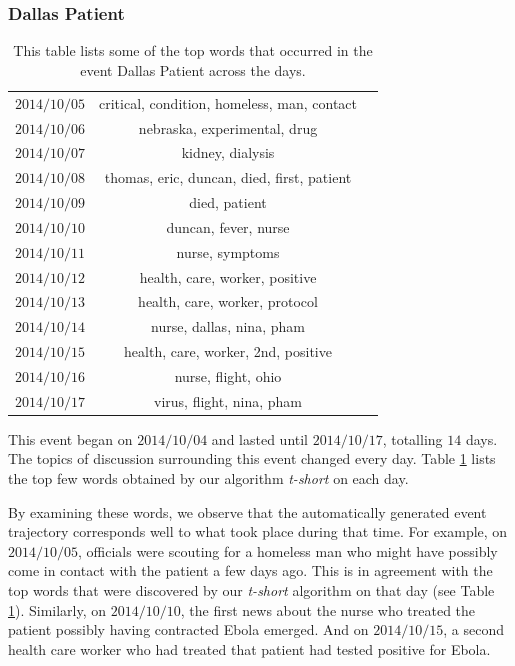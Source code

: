 \subsubsection{Dallas Patient}
\begin{table}
\begin{tabular}{c | c | c}
$2014/10/05$ & critical, condition, homeless, man, contact\\
$2014/10/06$ & nebraska, experimental, drug  \\
$2014/10/07$ & kidney, dialysis  \\
$2014/10/08$ & thomas, eric, duncan, died, first, patient \\
$2014/10/09$ & died, patient \\
$2014/10/10$ & duncan, fever, nurse \\
$2014/10/11$ & nurse, symptoms \\
$2014/10/12$ & health, care, worker, positive \\
$2014/10/13$ & health, care, worker, protocol \\
$2014/10/14$ & nurse, dallas, nina, pham \\
$2014/10/15$ & health, care, worker, 2nd, positive \\
$2014/10/16$ & nurse, flight, ohio \\
$2014/10/17$ & virus, flight, nina, pham \\
\end{tabular}
\caption{This table lists some of the top words that occurred in the event Dallas Patient across
the days.}
\label{tab:dallas_patient}
\end{table}
This event began on $2014/10/04$ and lasted until $2014/10/17$, totalling
$14$ days.  The topics of discussion surrounding this event changed every day.
Table \ref{tab:dallas_patient} lists the top few words obtained by our algorithm \emph{t-short} 
on each day.

By examining these words, we observe that the automatically generated event trajectory
corresponds well to what took
place during that time.
For example, on $2014/10/05$, officials were scouting for a homeless man who might
have possibly come in contact with the patient a few days ago.  This is in agreement with
the top words that were discovered by our \emph{t-short} algorithm on that day (see Table \ref{tab:dallas_patient}).
Similarly, on $2014/10/10$, the first news about the nurse who treated
the patient possibly having contracted Ebola emerged.  And on $2014/10/15$, a second health
care worker who had treated that patient had tested positive for Ebola.

